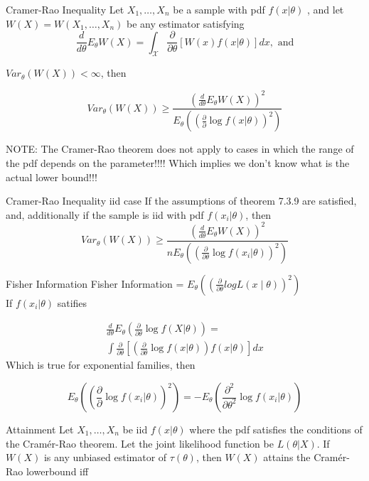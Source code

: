 \documentclass{article}
\begin{document}
\begin{multicols*}{3}
\begin{thmbox}{Cramer-Rao Inequality}
Let $X_1,\dots, X_n$ be a sample with pdf $f(x|\theta)$ , and let $W(X) = W(X_1,\dots,X_n)$ be any estimator satisfying
$$
\frac{d}{d\theta}E_{\theta}W(X) = \int_\mathcal{X}\frac{\partial}{\partial\theta}\left[W(x)f(x|\theta)\right]dx,\text{ and}
$$

$Var_\theta(W(X)) <\infty$, then 

$$
Var_\theta(W(X)) \geq \frac{\left(\frac{d}{d\theta}E_\theta W(X)\right)^2}{E_\theta\left(\left(\frac{\partial}{\partial}\log f(x|\theta)\right)^2\right)}
$$

NOTE: The Cramer-Rao theorem does not apply to cases in which the range of the pdf depends on the parameter!!!! Which implies we don't know what is the actual lower bound!!!
\end{thmbox}



\begin{thmbox}{Cramer-Rao Inequality iid case}
If the assumptions of theorem 7.3.9 are satisfied, and, additionally if the sample is iid with pdf $f(x_i|\theta)$, then
$$
Var_\theta(W(X)) \geq \frac{\left(\frac{d}{d\theta}E_\theta W(X)\right)^2}{nE_\theta\left(\left(\frac{\partial}{\partial\theta}\log f(x_i|\theta)\right)^2\right)}
$$

\end{thmbox}

\begin{thmbox}{Fisher Information}
Fisher Information = $E_{\theta}((\frac{\partial}{\partial \theta}log L(x\mid \theta))^2)$\\

If $f(x_i|\theta)$ satifies

\begin{multline}
\frac{d}{d\theta}E_\theta\left(\frac{\partial}{\partial\theta}\log f(X|\theta)\right) = \\%
\int\frac{\partial}{\partial\theta}\left[ 
\left(\frac{\partial}{\partial\theta}\log f(x|\theta)\right)%
f(x|\theta)\right]dx
\end{multline}
Which is true for exponential families, then

$$
E_\theta\left(\left(\frac{\partial}{\partial}\log f(x_i|\theta)\right)^2\right) = - E_\theta\left(\frac{\partial^2}{\partial\theta^2}\log f(x_i|\theta)\right)
$$

\end{thmbox}

\begin{thmbox}{Attainment}
Let $X_1,\dots,X_n$ be iid $f(x|\theta)$ where the pdf satisfies the conditions of the Cram\'er-Rao theorem. Let the joint likelihood function be $L(\theta|X)$. If $W(X)$ is any unbiased estimator of $\tau(\theta)$, then $W(X)$ attains the Cram\'er-Rao lowerbound iff


\end{thmbox}
\end{multicols*}
\end{document}
